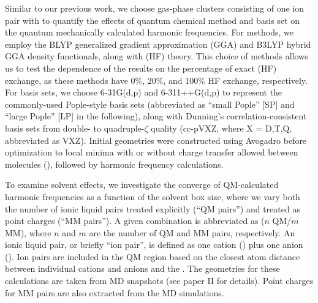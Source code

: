 \documentclass[%
  class = book,%
  crop = false,%
  float = true,%
  multi = true,%
  preview = false,%
]{standalone}
\begin{document}
Similar to our previous work\cite{Brinzer2015}, we choose gas-phase clusters consisting of one \ce{[C4C1im][PF6]} ion pair with  to quantify the effects of quantum chemical method and basis set on the quantum mechanically calculated harmonic frequencies. For methods, we employ the BLYP\cite{Becke1988,Lee1988} generalized gradient approximation (GGA) and B3LYP\cite{Becke1993,Stephens1994} hybrid GGA density functionals, along with \hf{} (HF) theory. This choice of methods allows us to test the dependence of the results on the percentage of exact (HF) exchange, as these methods have 0\%, 20\%, and 100\% HF exchange, respectively. For basis sets, we choose 6-31G(d,p)\cite{Hehre1972,Francl1982} and 6-311++G(d,p)\cite{Krishnan1980,McLean1980,Clark1983} to represent the commonly-used Pople-style basis sets (abbreviated as ``small Pople'' [SP] and ``large Pople'' [LP] in the following), along with Dunning's correlation-consistent basis sets from double- to quadruple-\(\zeta\) quality (cc-pVXZ, where X = D,T,Q, abbreviated as VXZ)\cite{Dunning1989,Dunning1993}. Initial geometries were constructed using Avogadro\cite{Hanwell2012,Avogadro} before optimization to local minima with or without charge transfer allowed between molecules (), followed by harmonic frequency calculations.

To examine solvent effects, we investigate the converge of QM-calculated harmonic frequencies as a function of the solvent box size, where we vary both the number of ionic liquid pairs treated explicitly (``QM pairs'') and treated as point charges (``MM pairs''). A given combination is abbreviated as (\(n\) QM/\(m\) MM), where \(n\) and \(m\) are the number of QM and MM pairs, respectively. An ionic liquid pair, or briefly ``ion pair'', is defined as one cation (\ce{[C4C1im]+}) plus one anion (\ce{[PF6]-}). Ion pairs are included in the QM region based on the closest atom distance between individual cations and anions and the . The geometries for these calculations are taken from MD snapshots (see paper II\cite{Daly2016} for details). Point charges for MM pairs are also extracted from the MD simulations.
\end{document}
